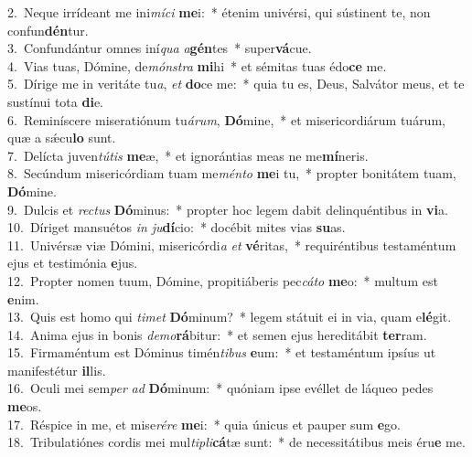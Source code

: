 {2.~}Neque irrídeant me ini\textit{mí}\textit{ci} \textbf{me}i:~* étenim univérsi, qui sústinent te, non confun\textbf{dén}tur.\\
{3.~}Confundántur omnes iní\textit{qua} \textit{a}\textbf{gén}tes~* super\textbf{vá}cue.\\
{4.~}Vias tuas, Dómine, de\textit{món}\textit{stra} \textbf{mi}hi~* et sémitas tuas édo\textbf{ce} me.\\
{5.~}Dírige me in veritáte tu\textit{a}, \textit{et} \textbf{do}ce me:~* quia tu es, Deus, Salvátor meus, et te sustínui tota \textbf{di}e.\\
{6.~}Reminíscere miseratiónum tu\textit{á}\textit{rum}, \textbf{Dó}mine,~* et misericordiárum tuárum, quæ a sǽcu\textbf{lo} sunt.\\
{7.~}Delícta juven\textit{tú}\textit{tis} \textbf{me}æ,~* et ignorántias meas ne me\textbf{mí}neris.\\
{8.~}Secúndum misericórdiam tuam me\textit{mén}\textit{to} \textbf{me}i tu,~* propter bonitátem tuam, \textbf{Dó}mine.\\
{9.~}Dulcis et \textit{re}\textit{ctus} \textbf{Dó}minus:~* propter hoc legem dabit delinquéntibus in \textbf{vi}a.\\
{10.~}Díriget mansuétos \textit{in} \textit{ju}\textbf{dí}cio:~* docébit mites vias \textbf{su}as.\\
{11.~}Univérsæ viæ Dómini, misericórdi\textit{a} \textit{et} \textbf{vé}ritas,~* requiréntibus testaméntum ejus et testimónia \textbf{e}jus.\\
{12.~}Propter nomen tuum, Dómine, propitiáberis pec\textit{cá}\textit{to} \textbf{me}o:~* multum est \textbf{e}nim.\\
{13.~}Quis est homo qui \textit{ti}\textit{met} \textbf{Dó}minum?~* legem státuit ei in via, quam e\textbf{lé}git.\\
{14.~}Anima ejus in bonis \textit{de}\textit{mo}\textbf{rá}bitur:~* et semen ejus hereditábit \textbf{ter}ram.\\
{15.~}Firmaméntum est Dóminus timén\textit{ti}\textit{bus} \textbf{e}um:~* et testaméntum ipsíus ut manifestétur \textbf{il}lis.\\
{16.~}Oculi mei sem\textit{per} \textit{ad} \textbf{Dó}minum:~* quóniam ipse evéllet de láqueo pedes \textbf{me}os.\\
{17.~}Réspice in me, et mise\textit{ré}\textit{re} \textbf{me}i:~* quia únicus et pauper sum \textbf{e}go.\\
{18.~}Tribulatiónes cordis mei mul\textit{ti}\textit{pli}\textbf{cá}tæ sunt:~* de necessitátibus meis éru\textbf{e} me.\\
